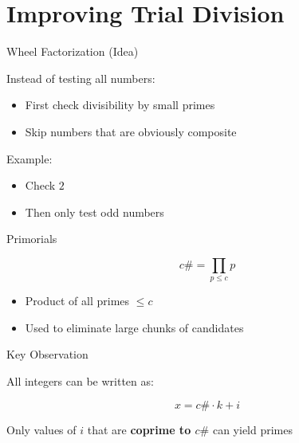 \documentclass{beamer}
\begin{document}

\section{Improving Trial Division}

\begin{frame}{Wheel Factorization (Idea)}

Instead of testing all numbers:

\begin{itemize}
    \item First check divisibility by small primes
    \item Skip numbers that are obviously composite
\end{itemize}

\pause

Example:
\begin{itemize}
    \item Check $2$
    \item Then only test odd numbers
\end{itemize}

\end{frame}


\begin{frame}{Primorials}

\[
c\# = \prod_{p \le c} p
\]

\pause

\begin{itemize}
    \item Product of all primes $\le c$
    \item Used to eliminate large chunks of candidates
\end{itemize}

\end{frame}


\begin{frame}{Key Observation}

All integers can be written as:

\[
x = c\# \cdot k + i
\]

\pause

Only values of $i$ that are \textbf{coprime to $c\#$} can yield primes

\end{frame}
\end{document}
